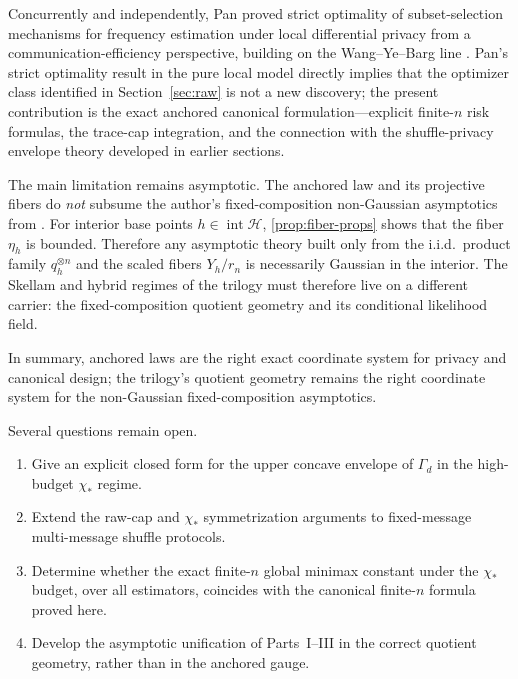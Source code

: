 \documentclass[11pt]{amsart}
\theoremstyle{definition}
\newcommand{\cH}{\mathcal H}
\begin{document}
Concurrently and independently, Pan \cite{pan-strict} proved strict optimality of subset-selection mechanisms for frequency estimation under local differential privacy from a communication-efficiency perspective, building on the Wang--Ye--Barg line \cite{wang-ldp,ye-barg}. Pan's strict optimality result in the pure local model directly implies that the optimizer class identified in Section~\ref{sec:raw} is not a new discovery; the present contribution is the exact anchored canonical formulation---explicit finite-$n$ risk formulas, the trace-cap integration, and the connection with the shuffle-privacy envelope theory developed in earlier sections.

The main limitation remains asymptotic. The anchored law and its projective fibers do \emph{not} subsume the author's fixed-composition non-Gaussian asymptotics from \cite{shvets-part2,shvets-part3}. For interior base points $h\in \operatorname{int}\cH$, \cref{prop:fiber-props} shows that the fiber $\eta_h$ is bounded. Therefore any asymptotic theory built only from the i.i.d.\ product family $q_h^{\otimes n}$ and the scaled fibers $Y_h/r_n$ is necessarily Gaussian in the interior. The Skellam and hybrid regimes of the trilogy must therefore live on a different carrier: the fixed-composition quotient geometry and its conditional likelihood field.

In summary, anchored laws are the right exact coordinate system for privacy and canonical design; the trilogy's quotient geometry remains the right coordinate system for the non-Gaussian fixed-composition asymptotics.

Several questions remain open.
\begin{enumerate}[label=\textup{(\arabic*)}]
\item Give an explicit closed form for the upper concave envelope of $\Gamma_d$ in the high-budget $\chi_*$ regime.
\item Extend the raw-cap and $\chi_*$ symmetrization arguments to fixed-message multi-message shuffle protocols.
\item Determine whether the exact finite-$n$ global minimax constant under the $\chi_*$ budget, over all estimators, coincides with the canonical finite-$n$ formula proved here.
\item Develop the asymptotic unification of Parts~I--III in the correct quotient geometry, rather than in the anchored gauge.
\end{enumerate}


\appendix
\end{document}
